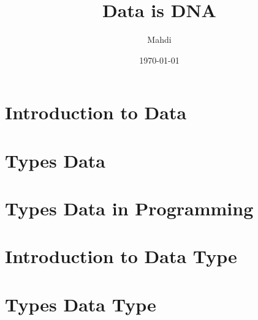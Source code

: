 \documentclass[12pt, oneside]{book}
\title{{\Huge Data is DNA}}
\author{{\LARGE Mahdi}}
\date{{\large \today}}
\begin{document}
	\frontmatter
	\mainmatter
	\maketitle
	\tableofcontents
\chapter{Introduction to Data}
\chapter{Types Data}
\chapter{Types Data in Programming}
\chapter{Introduction to Data Type}
\chapter{Types Data Type}
\end{document}
